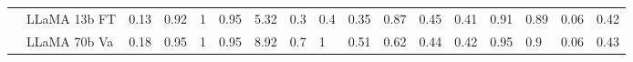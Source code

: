 \begin{table*}[t]
{\begin{tabular}{@{}ll|llll|llll|lll|ll|ll@{}}
                           & LLaMA 13b FT         & 0.13                                                                    & 0.92                                                                     & 1                                                                     & 0.95                                                                  & 5.32                                                                    & 0.3                                                                   & 0.4                                                                   & 0.35                                                                   & 0.87                                                                    & 0.45                                                                  & 0.41                                                                   & 0.91                                                                   & 0.89                                                                   & 0.06                                                                     & 0.42                                                                     \\
                           & LLaMA 70b Va         & 0.18                                                                    & 0.95                                                                     & 1                                                                     & 0.95                                                                  & 8.92                                                                    & 0.7                                                                   & 1                                                                     & 0.51                                                                   & 0.62                                                                    & 0.44                                                                  & 0.42                                                                   & 0.95                                                                   & 0.9                                                                    & 0.06                                                                     & 0.43                                                                     \\

\end{tabular}}
\end{table*}
